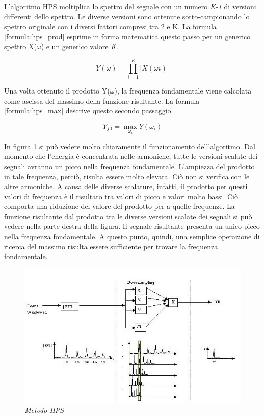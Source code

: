 	L'algoritmo HPS moltiplica lo spettro del segnale con un numero \emph{K-1} di versioni differenti dello spettro.
	Le diverse versioni sono ottenute sotto-campionando lo spettro originale con i diversi fattori compresi tra 2 e K.
	La formula \ref{formula:hps_prod} esprime in forma matematica questo passo per un generico spettro X($\omega$) e un generico valore \emph{K}.

		\begin{equation}\label{formula:hps_prod}
			Y(\omega) = \prod_{i=1}^K \left | X(\omega i) \right |
		\end{equation}

	Una volta ottenuto il prodotto Y($\omega$), la frequenza fondamentale viene calcolata come ascissa del massimo della funzione risultante. 
	La formula \ref{formula:hps_max} descrive questo secondo passaggio.

		\begin{equation}\label{formula:hps_max}
			Y_{f0} = \max_{\omega_i} Y \left(\omega_i \right )
		\end{equation}

	In figura \ref{fig:HPS} si può vedere molto chiaramente il funzionamento dell'algoritmo. 
	Dal momento che l'energia è concentrata nelle armoniche, tutte le versioni scalate dei segnali avranno un picco nella frequenza fondamentale. 
	L'ampiezza del prodotto in tale frequenza, perciò, risulta essere molto elevata.
	Ciò non si verifica con le altre armoniche.
	A causa delle diverse scalature, infatti, il prodotto per questi valori di frequenza è il risultato tra valori di picco e valori molto bassi.
	Ciò comporta una riduzione del valore del prodotto per a quelle frequenze. 
	La funzione risultante dal prodotto tra le diverse versioni scalate dei segnali si può vedere nella parte destra della figura. 
	Il segnale risultante presenta un unico picco nella frequenza fondamentale.
	A questo punto, quindi, una semplice operazione di ricerca del massimo risulta essere sufficiente per trovare la frequenza fondamentale.

		\begin{figure}[h]
		  \begin{center} 
		    \includegraphics[width=\textwidth*\real{0.68}]{images/ch_04/processo.jpg}
		  \end{center} 
		  \caption{\textit{Metodo HPS}}  
		  \label{fig:HPS}
		\end{figure}

